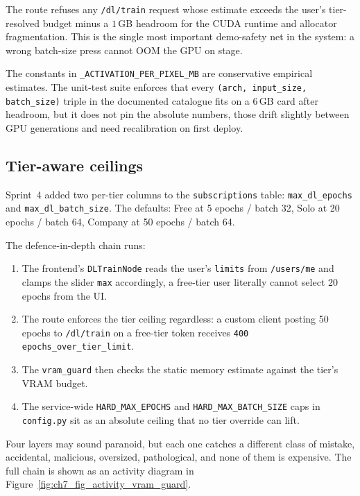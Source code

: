 \documentclass[12pt, a4paper, oneside]{report}
\begin{document}
The route refuses any \texttt{/dl/train} request whose estimate
exceeds the user's tier-resolved budget minus a $1$\,GB headroom for
the CUDA runtime and allocator fragmentation. This is the single
most important demo-safety net in the system: a wrong batch-size
press cannot OOM the GPU on stage.

The constants in \texttt{\_ACTIVATION\_PER\_PIXEL\_MB} are
conservative empirical estimates. The unit-test suite enforces that
every \texttt{(arch, input\_size, batch\_size)} triple in the
documented catalogue fits on a 6\,GB card after headroom, but it
does not pin the absolute numbers, those drift slightly between
GPU generations and need recalibration on first deploy.

\subsection{Tier-aware ceilings}

Sprint~4 added two per-tier columns to the \texttt{subscriptions}
table: \texttt{max\_dl\_epochs} and \texttt{max\_dl\_batch\_size}.
The defaults: Free at 5 epochs / batch 32, Solo at 20 epochs / batch
64, Company at 50 epochs / batch 64.

The defence-in-depth chain runs:

\begin{enumerate}
    \item The frontend's \texttt{DLTrainNode} reads the user's
        \texttt{limits} from \texttt{/users/me} and clamps the
        slider \texttt{max} accordingly, a free-tier user
        literally cannot select 20 epochs from the UI.
    \item The route enforces the tier ceiling regardless: a custom
        client posting 50 epochs to \texttt{/dl/train} on a
        free-tier token receives \texttt{400 epochs\_over\_tier\_limit}.
    \item The \texttt{vram\_guard} then checks the static memory
        estimate against the tier's VRAM budget.
    \item The service-wide \texttt{HARD\_MAX\_EPOCHS} and
        \texttt{HARD\_MAX\_BATCH\_SIZE} caps in \texttt{config.py}
        sit as an absolute ceiling that no tier override can lift.
\end{enumerate}

Four layers may sound paranoid, but each one catches a different
class of mistake, accidental, malicious, oversized, pathological, and none of them is expensive. The full chain is shown as an
activity diagram in Figure~\ref{fig:ch7_fig_activity_vram_guard}.
\end{document}
